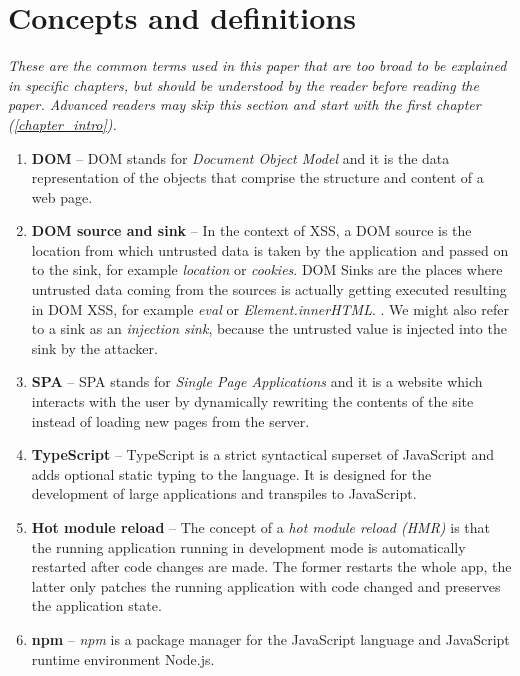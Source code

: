 \chapter*{Concepts and definitions} %
\label{definitions}

\emph{These are the common terms used in this paper that are too broad to be explained in specific
  chapters, but should be understood by the reader before reading the paper. Advanced readers may
  skip this section and start with the first chapter (\ref{chapter_intro}).}

\begin{enumerate}
  \item \label{def:dom} \textbf{DOM} -- DOM stands for \emph{Document Object Model} and it is
        the data representation of the objects that comprise the structure and content of a web
        page.
  \item \label{def:dom_source_sink} \textbf{DOM source and sink} -- In the context of XSS, a DOM
        source is the location from which untrusted data is taken by the application and passed on
        to the sink, for example \emph{location} or \emph{cookies}. DOM Sinks are the places where
        untrusted data coming from the sources is actually getting executed resulting in DOM XSS,
        for example \emph{eval} or \emph{Element.innerHTML}. \cite{source_sink_definition}. We might
        also refer to a sink as an \emph{injection sink}, because the untrusted value is injected
        into the sink by the attacker.
  \item \label{def:spa} \textbf{SPA} -- SPA stands for \emph{Single Page Applications} and it
        is a website which interacts with the user by dynamically rewriting the contents of the site
        instead of loading new pages from the server.
  \item \label{def:ts} \textbf{TypeScript} -- TypeScript is a strict syntactical superset of
        JavaScript and adds optional static typing to the language. It is designed for the
        development of large applications and transpiles to JavaScript.
  \item \label{def:hot_reload} \textbf{Hot module reload} -- The concept of a \emph{hot module
          reload (HMR)} is that the running application running in development mode is automatically
        restarted after code changes are made. The former restarts the whole app, the latter only
        patches the running application with code changed and preserves the application state.
  \item \label{def:npm} \textbf{npm} -- \emph{npm} is a package manager for the JavaScript
        language and JavaScript runtime environment Node.js.
\end{enumerate}
